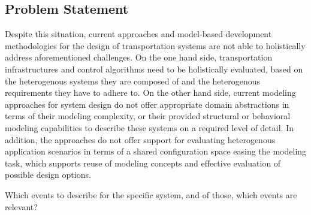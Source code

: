 \documentclass[graybox]{svmult}
\begin{document}
\subsection{Problem Statement}

Despite this situation, current approaches and model-based development methodologies for the design of transportation systems are not able to holistically address aforementioned challenges. On the one hand side, transportation infrastructures and control algorithms need to be holistically evaluated, based on the heterogenous systems they are composed of and the heterogenous requirements they have to adhere to. On the other hand side, current modeling approaches for system design do not offer appropriate domain abstractions in terms of their modeling complexity, or their provided structural or behavioral modeling capabilities to describe these systems on a required level of detail. In addition, the approaches do not offer support for evaluating heterogenous application scenarios in terms of a shared configuration space easing the modeling task, which supports reuse of modeling concepts and effective evaluation of possible design options. 

Which events to describe for the specific system, and of those, which events are relevant?
\vspace{-2mm}

\end{document}
